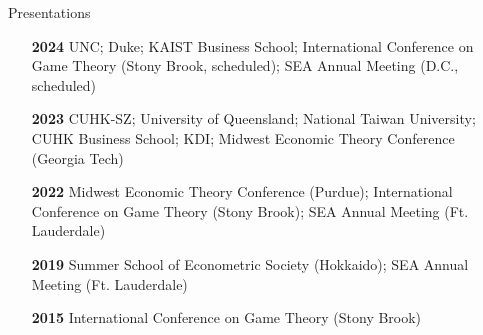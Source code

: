 \begin{rSection}{Presentations}

\begin{itemize}
	\item [\textbf{2024}] UNC; Duke; KAIST Business School; International Conference on Game Theory (Stony Brook, scheduled); SEA Annual Meeting (D.C., scheduled)
	\item [\textbf{2023}] CUHK-SZ; University of Queensland; National Taiwan University; CUHK Business School; KDI; Midwest Economic Theory Conference (Georgia Tech)
	\item [\textbf{2022}] Midwest Economic Theory Conference (Purdue); International Conference on Game Theory (Stony Brook); SEA Annual Meeting (Ft. Lauderdale)
	\item [\textbf{2019}] Summer School of Econometric Society (Hokkaido); SEA Annual Meeting (Ft. Lauderdale)
	\item [\textbf{2015}] International Conference on Game Theory (Stony Brook)
\end{itemize}
	

\end{rSection}